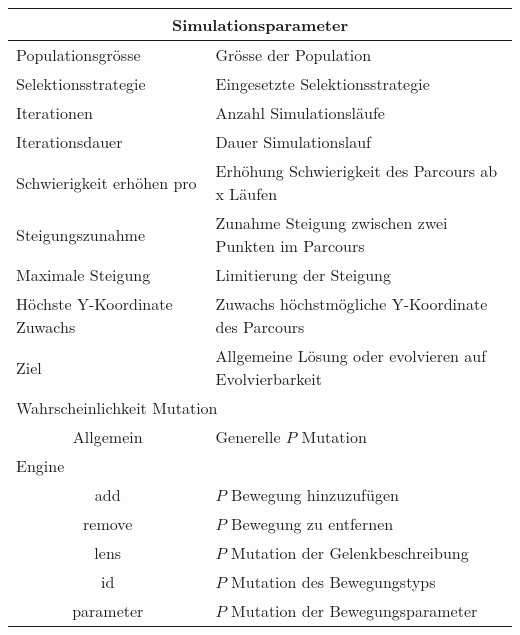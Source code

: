 
\begin{tabular}{ | p{} | p{} | }

  \hline
  \multicolumn{2}{|c|}{Simulationsparameter} \\
  \hline
  Populationsgrösse & Grösse der Population \\ \hline
  Selektionsstrategie & Eingesetzte Selektionsstrategie \\ \hline
  Iterationen & Anzahl Simulationsläufe \\ \hline
  Iterationsdauer & Dauer Simulationslauf \\ \hline
  Schwierigkeit erhöhen pro & Erhöhung Schwierigkeit des Parcours ab x Läufen \\ \hline
  Steigungszunahme & Zunahme Steigung zwischen zwei Punkten im Parcours \\ \hline
  Maximale Steigung & Limitierung der Steigung\\ \hline
  Höchste Y-Koordinate Zuwachs & Zuwachs höchstmögliche Y-Koordinate des Parcours \\ \hline
  Ziel & Allgemeine Lösung oder evolvieren auf Evolvierbarkeit \\ \hline
  \multicolumn{2}{|l|}{Wahrscheinlichkeit Mutation}\\ \hline
  \multicolumn{1}{|c|}{Allgemein} & Generelle \(P\) Mutation \\ \hline
  Engine &  \\ \hline
  \multicolumn{1}{|c|}{add} & \(P\) Bewegung hinzuzufügen \\ \hline
  \multicolumn{1}{|c|}{remove} & \(P\) Bewegung zu entfernen \\ \hline
  \multicolumn{1}{|c|}{lens} & \(P\) Mutation der Gelenkbeschreibung \\ \hline
  \multicolumn{1}{|c|}{id} & \(P\) Mutation des Bewegungstyps\\ \hline
  \multicolumn{1}{|c|}{parameter} & \(P\) Mutation der Bewegungsparameter \\ \hline

\end{tabular}
